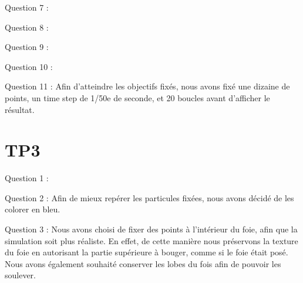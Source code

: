\documentclass[a4paper,12pt]{article}
\begin{document}
Question 7 :%

Question 8 :%

Question 9 :%

Question 10 :%


Question 11 : Afin d'atteindre les objectifs fixés, nous avons fixé une dizaine de points, un time step de 1/50e de seconde, et 20 boucles avant d'afficher le résultat.

\section{TP3}

Question 1 :

Question 2 : Afin de mieux repérer les particules fixées, nous avons décidé de les colorer en bleu.

Question 3 : Nous avons choisi de fixer des points à l'intérieur du foie, afin que la simulation soit plus réaliste. En effet, de cette manière nous préservons la \og{}texture\fg{} du foie en autorisant la partie supérieure à bouger, comme si le foie était posé. Nous avons également souhaité conserver les lobes du fois afin de pouvoir les soulever.
\end{document}
